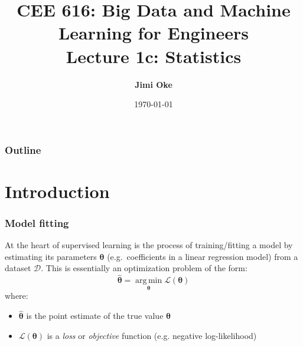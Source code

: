 \documentclass[smaller]{beamer}
\title[CEE 616 1c: Statistics]{ {\normalsize CEE 616:  Big Data  and Machine Learning for Engineers}
  \\ Lecture 1c: Statistics}
\date[\today]{\footnotesize \today}
\author{{\bf Jimi Oke}}
\institute[UMass Amherst]{
  \begin{tikzpicture}[baseline=(current bounding box.center)]
    \node[anchor=base] at (-7,0) (its) {\texttt{[image: UMassEngineering\_vert]}} ;
  \end{tikzpicture}
}
\DeclareMathOperator*{\argmin}{arg\,min}
\newcommand{\?}{\stackrel{?}{=}}
\begin{document}
\maketitle

\begin{frame}
  \frametitle{Outline}
  \tableofcontents
\end{frame}


\section{Introduction}
\begin{frame}
  \frametitle{Model fitting}
  \pause At the heart of supervised learning is the process of training/fitting a model by estimating its parameters
  $\bm \theta$ (e.g.\ coefficients in a linear regression model) from a dataset $\mathcal{D}$.
  \pause
  \bigskip
  This is essentially an optimization problem of the form:
  \pause
  \begin{equation}
    \bm{\hat\theta} = \argmin\limits_{\bm\theta}\mathcal{L}(\bm\theta)
  \end{equation}
  \pause
  where:
  \pause
  \begin{itemize}
  \item $\bm{\hat\theta}$ is the point estimate of the true value $\bm\theta$ \pause
  \item $\mathcal{L}(\bm\theta)$ is a \textit{loss} or \textit{objective} function (e.g. negative log-likelihood) 
\end{itemize}


\end{frame}
\end{document}
